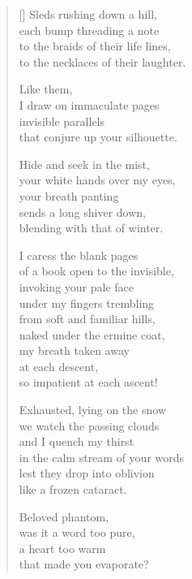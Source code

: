 \documentclass[twocolumn,11pt]{article}
\begin{document}
\thispagestyle{empty}

\poemtitle{}

\settowidth{\versewidth}{in the calm stream of your words}

\bigskip

\begin{verse}[\versewidth]
  Sleds rushing down a hill, \\
  each bump threading a note \\
  to the braids of their life lines, \\
  to the necklaces of their laughter.

  Like them, \\
  I draw on immaculate pages \\
  invisible parallels \\
  that conjure up your silhouette.

  Hide and seek in the mist, \\
  your white hands over my eyes, \\
  your breath panting \\
  sends a long shiver down, \\
  blending with that of winter.

  I caress the blank pages \\
  of a book open to the invisible, \\
  invoking your pale face \\
  under my fingers trembling \\
  from soft and familiar hills, \\
  naked under the ermine coat, \\
  my breath taken away \\
  at each descent, \\
  so impatient at each ascent!

  Exhausted, lying on the snow \\
  we watch the passing clouds \\
  and I quench my thirst \\
  in the calm stream of your words \\
  lest they drop into oblivion \\
  like a frozen cataract.

  \newpage

  Beloved phantom, \\
  was it a word too pure, \\
  a heart too warm \\
  that made you evaporate?


\end{verse}
\end{document}
